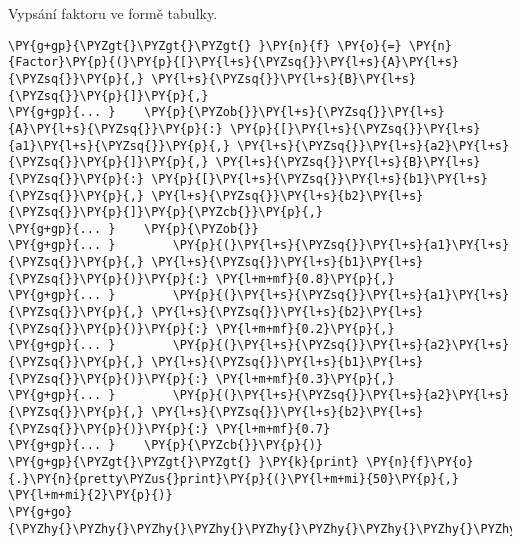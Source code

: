 \begin{fulllineitems}
\begin{fulllineitems}
\begin{quote}
\begin{description}
\end{description}\end{quote}

\end{fulllineitems}


\begin{fulllineitems}
\label{alex.infer:alex.infer.factor.Factor.pretty_print}
Vypsání faktoru ve formě tabulky.

\begin{Verbatim}[commandchars=\\\{\}]
\PY{g+gp}{\PYZgt{}\PYZgt{}\PYZgt{} }\PY{n}{f} \PY{o}{=} \PY{n}{Factor}\PY{p}{(}\PY{p}{[}\PY{l+s}{\PYZsq{}}\PY{l+s}{A}\PY{l+s}{\PYZsq{}}\PY{p}{,} \PY{l+s}{\PYZsq{}}\PY{l+s}{B}\PY{l+s}{\PYZsq{}}\PY{p}{]}\PY{p}{,}
\PY{g+gp}{... }    \PY{p}{\PYZob{}}\PY{l+s}{\PYZsq{}}\PY{l+s}{A}\PY{l+s}{\PYZsq{}}\PY{p}{:} \PY{p}{[}\PY{l+s}{\PYZsq{}}\PY{l+s}{a1}\PY{l+s}{\PYZsq{}}\PY{p}{,} \PY{l+s}{\PYZsq{}}\PY{l+s}{a2}\PY{l+s}{\PYZsq{}}\PY{p}{]}\PY{p}{,} \PY{l+s}{\PYZsq{}}\PY{l+s}{B}\PY{l+s}{\PYZsq{}}\PY{p}{:} \PY{p}{[}\PY{l+s}{\PYZsq{}}\PY{l+s}{b1}\PY{l+s}{\PYZsq{}}\PY{p}{,} \PY{l+s}{\PYZsq{}}\PY{l+s}{b2}\PY{l+s}{\PYZsq{}}\PY{p}{]}\PY{p}{\PYZcb{}}\PY{p}{,}
\PY{g+gp}{... }    \PY{p}{\PYZob{}}
\PY{g+gp}{... }        \PY{p}{(}\PY{l+s}{\PYZsq{}}\PY{l+s}{a1}\PY{l+s}{\PYZsq{}}\PY{p}{,} \PY{l+s}{\PYZsq{}}\PY{l+s}{b1}\PY{l+s}{\PYZsq{}}\PY{p}{)}\PY{p}{:} \PY{l+m+mf}{0.8}\PY{p}{,}
\PY{g+gp}{... }        \PY{p}{(}\PY{l+s}{\PYZsq{}}\PY{l+s}{a1}\PY{l+s}{\PYZsq{}}\PY{p}{,} \PY{l+s}{\PYZsq{}}\PY{l+s}{b2}\PY{l+s}{\PYZsq{}}\PY{p}{)}\PY{p}{:} \PY{l+m+mf}{0.2}\PY{p}{,}
\PY{g+gp}{... }        \PY{p}{(}\PY{l+s}{\PYZsq{}}\PY{l+s}{a2}\PY{l+s}{\PYZsq{}}\PY{p}{,} \PY{l+s}{\PYZsq{}}\PY{l+s}{b1}\PY{l+s}{\PYZsq{}}\PY{p}{)}\PY{p}{:} \PY{l+m+mf}{0.3}\PY{p}{,}
\PY{g+gp}{... }        \PY{p}{(}\PY{l+s}{\PYZsq{}}\PY{l+s}{a2}\PY{l+s}{\PYZsq{}}\PY{p}{,} \PY{l+s}{\PYZsq{}}\PY{l+s}{b2}\PY{l+s}{\PYZsq{}}\PY{p}{)}\PY{p}{:} \PY{l+m+mf}{0.7}
\PY{g+gp}{... }    \PY{p}{\PYZcb{}}\PY{p}{)}
\PY{g+gp}{\PYZgt{}\PYZgt{}\PYZgt{} }\PY{k}{print} \PY{n}{f}\PY{o}{.}\PY{n}{pretty\PYZus{}print}\PY{p}{(}\PY{l+m+mi}{50}\PY{p}{,} \PY{l+m+mi}{2}\PY{p}{)}
\PY{g+go}{\PYZhy{}\PYZhy{}\PYZhy{}\PYZhy{}\PYZhy{}\PYZhy{}\PYZhy{}\PYZhy{}\PYZhy{}\PYZhy{}\PYZhy{}\PYZhy{}\PYZhy{}\PYZhy{}\PYZhy{}\PYZhy{}\PYZhy{}\PYZhy{}\PYZhy{}\PYZhy{}\PYZhy{}\PYZhy{}\PYZhy{}\PYZhy{}\PYZhy{}\PYZhy{}\PYZhy{}\PYZhy{}\PYZhy{}\PYZhy{}\PYZhy{}\PYZhy{}\PYZhy{}\PYZhy{}\PYZhy{}\PYZhy{}\PYZhy{}\PYZhy{}\PYZhy{}\PYZhy{}\PYZhy{}\PYZhy{}\PYZhy{}\PYZhy{}\PYZhy{}\PYZhy{}\PYZhy{}\PYZhy{}\PYZhy{}\PYZhy{}}

\end{Verbatim}
\end{fulllineitems}
\end{fulllineitems}
